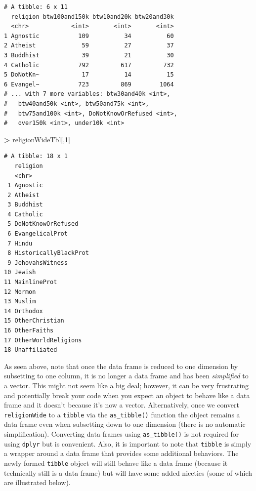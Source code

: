 \documentclass[]{krantz}
\makeatletter
\newenvironment{Shaded}{\begin{snugshade}}{\end{snugshade}}
\newcommand{\DecValTok}[1]{\textcolor[rgb]{0.06,0.06,0.06}{#1}}
\newcommand{\StringTok}[1]{\textcolor[rgb]{0.5,0.5,0.5}{#1}}
\newcommand{\OperatorTok}[1]{\textcolor[rgb]{0.43,0.43,0.43}{\textbf{#1}}}
\newcommand{\NormalTok}[1]{#1}
\newenvironment{kframe}{%
\medskip{}
\setlength{\fboxsep}{.8em}
 \def\at@end@of@kframe{}%
 \ifinner\ifhmode%
  \def\at@end@of@kframe{\end{minipage}}%
  \begin{minipage}{\columnwidth}%
 \fi\fi%
 \def\FrameCommand##1{\hskip\@totalleftmargin \hskip-\fboxsep
 \colorbox{shadecolor}{##1}\hskip-\fboxsep
     \hskip-\linewidth \hskip-\@totalleftmargin \hskip\columnwidth}%
 \MakeFramed {\advance\hsize-\width
   \@totalleftmargin\z@ \linewidth\hsize
   \@setminipage}}%
 {\par\unskip\endMakeFramed%
 \at@end@of@kframe}
\renewenvironment{Shaded}{\begin{kframe}}{\end{kframe}}
\makeatother
\begin{document}
\begin{verbatim}
# A tibble: 6 x 11
  religion btw100and150k btw10and20k btw20and30k
  <chr>            <int>       <int>       <int>
1 Agnostic           109          34          60
2 Atheist             59          27          37
3 Buddhist            39          21          30
4 Catholic           792         617         732
5 DoNotKn~            17          14          15
6 Evangel~           723         869        1064
# ... with 7 more variables: btw30and40k <int>,
#   btw40and50k <int>, btw50and75k <int>,
#   btw75and100k <int>, DoNotKnowOrRefused <int>,
#   over150k <int>, under10k <int>
\end{verbatim}

\begin{Shaded}
\begin{Highlighting}[]
\OperatorTok{>}\StringTok{ }\NormalTok{religionWideTbl[,}\DecValTok{1}\NormalTok{]}
\end{Highlighting}
\end{Shaded}

\begin{verbatim}
# A tibble: 18 x 1
   religion             
   <chr>                
 1 Agnostic             
 2 Atheist              
 3 Buddhist             
 4 Catholic             
 5 DoNotKnowOrRefused   
 6 EvangelicalProt      
 7 Hindu                
 8 HistoricallyBlackProt
 9 JehovahsWitness      
10 Jewish               
11 MainlineProt         
12 Mormon               
13 Muslim               
14 Orthodox             
15 OtherChristian       
16 OtherFaiths          
17 OtherWorldReligions  
18 Unaffiliated         
\end{verbatim}

As seen above, note that once the data frame is reduced to one dimension
by subsetting to one column, it is no longer a data frame and has been
\emph{simplified} to a vector. This might not seem like a big deal;
however, it can be very frustrating and potentially break your code when
you expect an object to behave like a data frame and it doesn't because
it's now a vector. Alternatively, once we convert \texttt{religionWide}
to a \texttt{tibble} via the \texttt{as\_tibble()} function the object
remains a data frame even when subsetting down to one dimension (there
is no automatic simplification). Converting data frames using
\texttt{as\_tibble()} is not required for using \texttt{dplyr} but is
convenient. Also, it is important to note that \texttt{tibble} is simply
a wrapper around a data frame that provides some additional behaviors.
The newly formed \texttt{tibble} object will still behave like a data
frame (because it technically still is a data frame) but will have some
added niceties (some of which are illustrated below).
\end{document}
